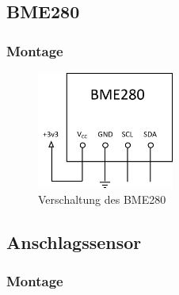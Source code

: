 \subsection{BME280}


\subsubsection{Montage}


\begin{figure}[H]
  \centering
  \includegraphics[width=0.4\textwidth]{./img/BME280_Plan.png}
  \caption{Verschaltung des BME280}\label{fig:BME280_Plan}
\end{figure}

\subsection{Anschlagssensor}


\subsubsection{Montage}




